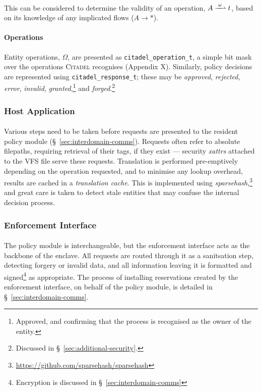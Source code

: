 \paragraph{} This can be considered to determine the validity of an operation, $A \xrightharpoonup{\;\omega\;} t$, based on its knowledge of any implicated flows ($A \rightarrow *$).

\paragraph{Operations} Entity operations, $\Omega$, are presented as \texttt{citadel\_operation\_t}, a simple bit mask over the operations \textsc{Citadel} recognises (Appendix X). Similarly, policy decisions are represented using \texttt{citadel\_response\_t}; these may be \textit{approved}, \textit{rejected}, \textit{error}, \textit{invalid}, \textit{granted},\footnote{Approved, and confirming that the process is recognised as the owner of the entity.} and \textit{forged}.\footnote{Discussed in §~\ref{sec:additional-security}.}


\subsubsection{Host Application}

\paragraph{} Various steps need to be taken before requests are presented to the resident policy module (§~\ref{sec:interdomain-comms}). Requests often refer to absolute filepaths, requiring retrieval of their tags, if they exist --- security \textit{xattrs} attached to the VFS file serve these requests. Translation is performed pre-emptively depending on the operation requested, and to minimise any lookup overhead, results are cached in a \textit{translation cache}. This is implemented using \textit{sparsehash},\footnote{\url{https://github.com/sparsehash/sparsehash}} and great care is taken to detect stale entities that may confuse the internal decision process.


\subsubsection{Enforcement Interface}
\paragraph{} The policy module is interchangeable, but the enforcement interface acts as the backbone of the enclave. All requests are routed through it as a sanitsation step, detecting forgery or invalid data, and all information leaving it is formatted and signed\footnote{Encryption is discussed in §~\ref{sec:interdomain-comms}} as appropriate. The process of installing reservations created by the enforcement interface, on behalf of the policy module, is detailed in §~\ref{sec:interdomain-comms}.


